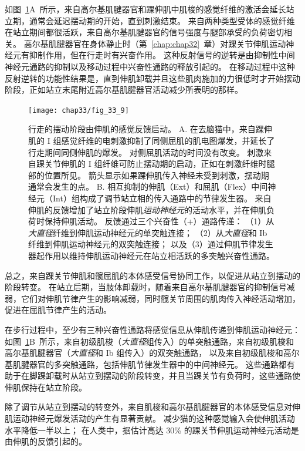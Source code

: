 如图~\ref{fig:33_9}A~所示，来自高尔基肌腱器官和踝伸肌中肌梭的感觉纤维的激活会延长站立期，通常会延迟摆动期的开始，直到刺激结束。
来自两种类型受体的感觉纤维在站立期间都很活跃，来自高尔基肌腱器官的信号强度与腿部承受的负荷密切相关。
高尔基肌腱器官在身体静止时（第~\ref{chap:chap32}~章）对踝关节伸肌运动神经元有抑制作用，但在行走时有兴奋作用。
这种反射信号的逆转是由抑制性中间神经元通路的抑制以及移动过程中兴奋性通路的释放引起的。
在移动过程中这种反射逆转的功能性结果是，直到伸肌卸载并且这些肌肉施加的力很低时才开始摆动阶段，正如站立末尾附近高尔基肌腱器官活动减少所表明的那样。


\begin{figure}[htbp]
	\centering
	\texttt{[image: chap33/fig\_33\_9]}
	\caption{行走的摆动阶段由伸肌的感觉反馈启动。
		A. 在去脑猫中，来自踝伸肌的 I 组感觉纤维的电刺激抑制了同侧屈肌的肌电图爆发，并延长了行走期间同侧伸肌的爆发。
		对侧屈肌活动的时间没有改变。
		刺激来自踝关节伸肌的 I 组纤维可防止摆动期的启动，正如在刺激纤维时腿部的位置所见。
		箭头显示如果踝伸肌传入神经未受到刺激，摆动期通常会发生的点\cite{whelan1995stimulation}。
		B. 相互抑制的伸肌（Ext）和屈肌（Flex）中间神经元（Int）组构成了调节站立相的传入通路中的节律发生器。
		来自伸肌的反馈增加了站立阶段伸肌\textit{运动神经元}的活动水平，并在伸肌负荷时保持伸肌活动。
		反馈通过三个兴奋性（+）通路传递：
		（1）从\textit{大直径}纤维到伸肌运动神经元的单突触连接；
		（2）从\textit{大直径}和 Ib 纤维到伸肌运动神经元的双突触连接；
		以及（3）通过伸肌节律发生器起作用以维持伸肌运动神经元在站立相活跃的多突触兴奋性通路。}
	\label{fig:33_9}
\end{figure}


总之，来自踝关节伸肌和髋屈肌的本体感受信号协同工作，以促进从站立到摆动的阶段转变。
在站立后期，当肢体卸载时，随着来自高尔基肌腱器官的抑制信号减弱，它们对伸肌节律产生的影响减弱，同时髋关节周围的肌肉传入神经活动增加，促进在屈肌节律产生的活动。


在步行过程中，至少有三种兴奋性通路将感觉信息从伸肌传递到伸肌运动神经元：
如图~\ref{fig:33_9}B~所示，来自初级肌梭（\textit{大直径}组传入）的单突触通路，来自初级肌梭和高尔基肌腱器官（\textit{大直径}和 Ib 组传入）的双突触通路， 以及来自初级肌梭和高尔基肌腱器官的多突触通路，包括伸肌节律发生器中的中间神经元。
这些通路都有助于在脚踝卸载时从站立到摆动的阶段转变，并且当踝关节有负荷时，这些通路使伸肌保持在站立阶段。


除了调节从站立到摆动的转变外，来自肌梭和高尔基肌腱器官的本体感受信息对伸肌运动神经元爆发活动的产生有显著贡献。
减少猫的这种感觉输入会使伸肌活动水平降低一半以上；
在人类中，据估计高达 30\% 的踝关节伸肌运动神经元活动是由伸肌的反馈引起的。



